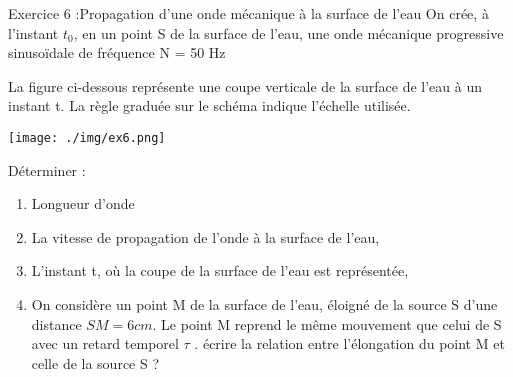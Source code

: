 \documentclass[12pt, french]{article}
\begin{document}
\begin{Box2}{Exercice 6 :Propagation d’une onde mécanique à la surface de l’eau  }
On crée, à l’instant $t_0$, en un point S de la surface de l’eau, une onde mécanique progressive sinusoïdale
de fréquence N = 50 Hz

La figure ci-dessous représente une coupe verticale de la surface de l’eau à un instant t. La règle
graduée sur le schéma indique l’échelle utilisée.

\begin{center}
	\texttt{[image: ./img/ex6.png]}
  \end{center}

Déterminer :
\begin{enumerate}
	\item  Longueur d’onde

	\item  La vitesse de propagation de l’onde à la surface de l’eau,

	\item  L’instant t, où la coupe de la surface de l’eau est représentée,

	\item  On considère un point M de la surface de l’eau, éloigné de la source S d’une distance $SM = 6cm$. Le point M reprend le même mouvement que celui de S avec un retard temporel $\tau$ . écrire
la relation entre l’élongation du point M et celle de la source S ?
\end{enumerate}
\end{Box2}
\end{document}
